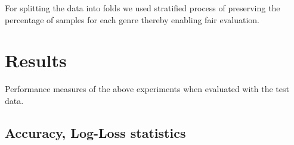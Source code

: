 \documentclass[fleqn,10pt]{SelfArx} %
\begin{document}
For splitting the data into folds we used stratified process of preserving the percentage of samples for each genre thereby enabling fair evaluation.



\section{Results}

Performance measures of the above experiments when evaluated with the test data.

\subsection{Accuracy, Log-Loss statistics}
\end{document}
